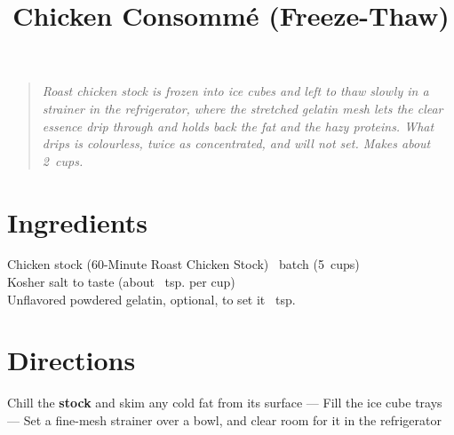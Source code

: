 \documentclass[11pt,letterpaper]{article}
\title{Chicken Consomm\'e (Freeze-Thaw)}
\author{}
\date{}
\begin{document}
\maketitle
\thispagestyle{empty}

\begin{quote}\textit{Roast chicken stock is frozen into ice cubes and left to thaw slowly in a strainer in the refrigerator, where the stretched gelatin mesh lets the clear essence drip through and holds back the fat and the hazy proteins. What drips is colourless, twice as concentrated, and will not set. Makes about 2~cups.}\end{quote}

\section*{Ingredients}
\setlength{\columnsep}{20pt}
\noindent
    Chicken stock (60-Minute Roast Chicken Stock) ~batch (5~cups) \\
    Kosher salt \dotfill to taste (about ~tsp. per cup) \\
    Unflavored powdered gelatin, optional, to set it ~tsp. \\

\section*{Directions}

\noindent
Chill the \textbf{stock} and skim any cold fat from its surface ---
Fill the ice cube trays ---
Set a fine-mesh strainer over a bowl, and clear room for it in the refrigerator
\end{document}
